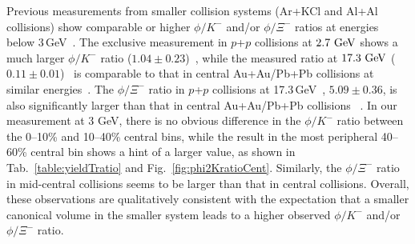 \documentclass[aps,tightenlines,superscriptaddress,twocolumn]{revtex4-1}
\begin{document}
Previous measurements from smaller collision systems (Ar+KCl and Al+Al collisions) show comparable or higher $\phi/K^-$ and/or $\phi/\Xi^-$ ratios at energies below 3\,GeV~\cite{HADES_phi_ArKCl:2009,Xi_ArKCl_HADES:2009,FOPI_phi_NiNi:2015,FOPI_phi_AlAl:2016}. The exclusive measurement in $p$+$p$ collisions at $\textup{2.7 GeV}$ shows a much larger $\phi/K^-$ ratio ($1.04\pm0.23$)~\cite{ANKE_phi:2008}, while the measured ratio at $\textup{17.3 GeV}$ ($0.11\pm0.01$)~\cite{NA61SHINE_pp_piKp:2017,NA61SHINE_pp_phi:2020} is comparable to that in central Au+Au/Pb+Pb collisions at similar energies~\cite{NA49_phi:2008,star_bes_strangeness:2020}. The $\phi/\Xi^-$ ratio in $p$+$p$ collisions at 17.3\,GeV~\cite{NA61SHINE_pp_phi:2020,NA61SHINE_pp_Xi:2020}, $5.09\pm0.36$, is also significantly larger than that in central Au+Au/Pb+Pb collisions ~\cite{NA49_phi:2008,NA49_Xi:2008,star_bes_strangeness:2020}. In our measurement at 3 GeV, there is no obvious difference in the $\phi/K^-$ ratio between the \textup{0--10\%} and \textup{10--40\%} central bins, while the result in the most peripheral 40--60\% central bin shows a hint of a larger value, as shown in Tab.~\ref{table:yieldTratio} and Fig.~\ref{fig:phi2KratioCent}. Similarly, the $\phi/\Xi^-$ ratio in mid-central collisions seems to be larger than that in central collisions. Overall, these observations are qualitatively consistent with the expectation that a smaller canonical volume in the smaller system leads to a higher observed $\phi/K^-$ and/or $\phi/\Xi^-$ ratio.
\end{document}
